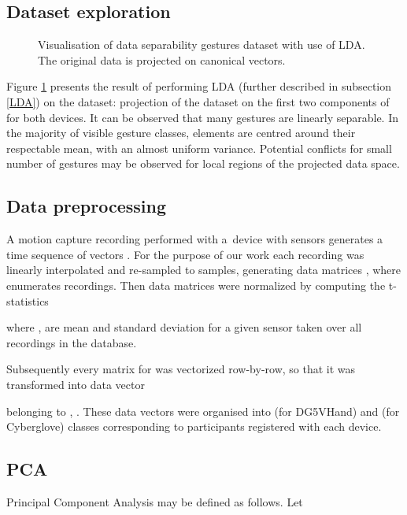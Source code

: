 \documentclass[]{article}
\begin{document}
\subsection{Dataset exploration}

\begin{figure}[h]
 \centering
{}
  \caption{Visualisation of data separability gestures dataset with use of LDA. The original data is projected on  canonical vectors.}
  \label{fig:lda_projection}
\end{figure}

Figure \ref{fig:lda_projection} presents the result of performing LDA (further described in subsection \ref{LDA}) on the
dataset: projection of the dataset on the first two components of 
 for both devices. It can be observed that many
gestures are linearly separable.  In the majority of visible gesture classes,
elements are centred around their respectable mean, with an almost uniform
variance. Potential conflicts for small number of gestures may be observed for
local regions of the projected data space.

\subsection{Data preprocessing}
\label{id:section:preprocessing}
A motion capture recording performed with a~device with  sensors
generates a time sequence of vectors . For the 
purpose of our work each recording was linearly interpolated and re-sampled to 
 samples, generating data matrices
, where  enumerates  recordings.
Then data matrices were normalized by computing the
t-statistics 

where ,  are mean and standard deviation for a given 
sensor  taken over all  recordings in the database.

Subsequently every matrix  for was vectorized row-by-row, so that
it was transformed into data vector 

belonging to , . 
These data vectors were organised into  (for DG5VHand) and  (for
Cyberglove) classes  corresponding to participants registered
with each device.
\subsection{PCA}
Principal Component Analysis \cite{Wall:2003} may be defined as follows. 
Let 
\end{document}
